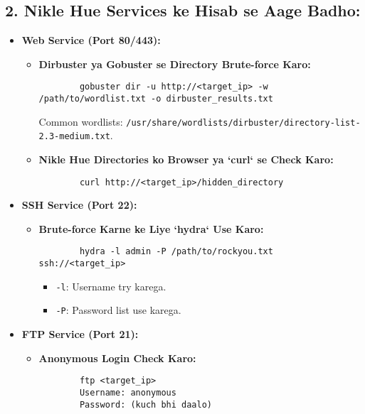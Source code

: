 \documentclass[a4paper]{article}
\begin{document}
\subsection{2. Nikle Hue Services ke Hisab se Aage Badho:}
\begin{itemize}
  \item \textbf{Web Service (Port 80/443):}
    \begin{itemize}
      \item \textbf{Dirbuster ya Gobuster se Directory Brute-force Karo:} \\
        \begin{lstlisting}
        gobuster dir -u http://<target_ip> -w /path/to/wordlist.txt -o dirbuster_results.txt  
        \end{lstlisting}
        Common wordlists: \texttt{/usr/share/wordlists/dirbuster/directory-list-2.3-medium.txt}.
      \item \textbf{Nikle Hue Directories ko Browser ya `curl` se Check Karo:} \\
        \begin{lstlisting}
        curl http://<target_ip>/hidden_directory  
        \end{lstlisting}
    \end{itemize}
  \item \textbf{SSH Service (Port 22):}
    \begin{itemize}
      \item \textbf{Brute-force Karne ke Liye `hydra` Use Karo:} \\
        \begin{lstlisting}
        hydra -l admin -P /path/to/rockyou.txt ssh://<target_ip>  
        \end{lstlisting}
        \begin{itemize}
          \item \texttt{-l}: Username try karega.
          \item \texttt{-P}: Password list use karega.
        \end{itemize}
    \end{itemize}
  \item \textbf{FTP Service (Port 21):}
    \begin{itemize}
      \item \textbf{Anonymous Login Check Karo:} \\
        \begin{lstlisting}
        ftp <target_ip>  
        Username: anonymous  
        Password: (kuch bhi daalo)  
        \end{lstlisting}

\end{itemize}
\end{itemize}
\end{document}

